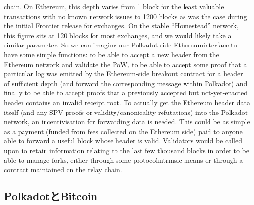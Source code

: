 chain. On Ethereum, this depth varies from 1 block for the least
valuable transactions with no known network issues to 1200 blocks as was
the case during the initial Frontier release for exchanges. On the
stable ``Homestead'' network, this figure sits at 120 blocks for most
exchanges, and we would likely take a similar parameter. So we can
imagine our Polkadot-side Ethereuminterface to have some simple
functions: to be able to accept a new header from the Ethereum network
and validate the PoW, to be able to accept some proof that a particular
log was emitted by the Ethereum-side breakout contract for a header of
sufficient depth (and forward the corresponding message within Polkadot)
and finally to be able to accept proofs that a previously accepted but
not-yet-enacted header contains an invalid receipt root. To actually get
the Ethereum header data itself (and any SPV proofs or
validity/canonicality refutations) into the Polkadot network, an
incentivisation for forwarding data is needed. This could be as simple
as a payment (funded from fees collected on the Ethereum side) paid to
anyone able to forward a useful block whose header is valid. Validators
would be called upon to retain information relating to the last few
thousand blocks in order to be able to manage forks, either through some
protocolintrinsic means or through a contract maintained on the relay
chain.

\hypertarget{polkadotux3068bitcoin}{%
\subsection{PolkadotとBitcoin}\label{polkadotux3068bitcoin}}

